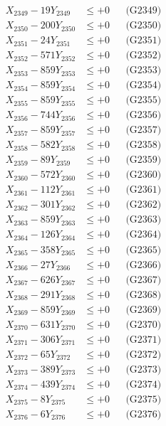 \documentclass[a4paper,10pt]{article}
\begin{document}
{\begin{align}
X_{2349} - 19Y_{2349} &\leq +0 && \text{(G2349)} \\
X_{2350} - 200Y_{2350} &\leq +0 && \text{(G2350)} \\
\allowbreak
X_{2351} - 24Y_{2351} &\leq +0 && \text{(G2351)} \\
X_{2352} - 571Y_{2352} &\leq +0 && \text{(G2352)} \\
X_{2353} - 859Y_{2353} &\leq +0 && \text{(G2353)} \\
X_{2354} - 859Y_{2354} &\leq +0 && \text{(G2354)} \\
X_{2355} - 859Y_{2355} &\leq +0 && \text{(G2355)} \\
X_{2356} - 744Y_{2356} &\leq +0 && \text{(G2356)} \\
X_{2357} - 859Y_{2357} &\leq +0 && \text{(G2357)} \\
X_{2358} - 582Y_{2358} &\leq +0 && \text{(G2358)} \\
X_{2359} - 89Y_{2359} &\leq +0 && \text{(G2359)} \\
X_{2360} - 572Y_{2360} &\leq +0 && \text{(G2360)} \\
\allowbreak
X_{2361} - 112Y_{2361} &\leq +0 && \text{(G2361)} \\
X_{2362} - 301Y_{2362} &\leq +0 && \text{(G2362)} \\
X_{2363} - 859Y_{2363} &\leq +0 && \text{(G2363)} \\
X_{2364} - 126Y_{2364} &\leq +0 && \text{(G2364)} \\
X_{2365} - 358Y_{2365} &\leq +0 && \text{(G2365)} \\
X_{2366} - 27Y_{2366} &\leq +0 && \text{(G2366)} \\
X_{2367} - 626Y_{2367} &\leq +0 && \text{(G2367)} \\
X_{2368} - 291Y_{2368} &\leq +0 && \text{(G2368)} \\
X_{2369} - 859Y_{2369} &\leq +0 && \text{(G2369)} \\
X_{2370} - 631Y_{2370} &\leq +0 && \text{(G2370)} \\
\allowbreak
X_{2371} - 306Y_{2371} &\leq +0 && \text{(G2371)} \\
X_{2372} - 65Y_{2372} &\leq +0 && \text{(G2372)} \\
X_{2373} - 389Y_{2373} &\leq +0 && \text{(G2373)} \\
X_{2374} - 439Y_{2374} &\leq +0 && \text{(G2374)} \\
X_{2375} - 8Y_{2375} &\leq +0 && \text{(G2375)} \\
X_{2376} - 6Y_{2376} &\leq +0 && \text{(G2376)} \\

\end{align}}
\end{document}
